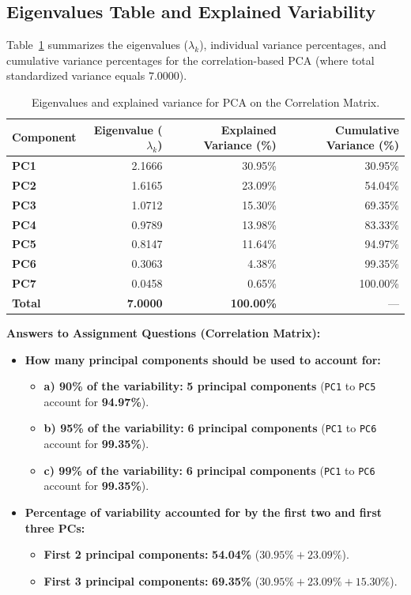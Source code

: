 \documentclass[11pt,a4paper]{article}
\begin{document}
\subsection{Eigenvalues Table and Explained Variability}

Table~\ref{tab:corr_eigen} summarizes the eigenvalues ($\lambda_k$), individual variance percentages, and cumulative variance percentages for the correlation-based PCA (where total standardized variance equals $7.0000$).

\begin{table}[H]
\centering
\caption{Eigenvalues and explained variance for PCA on the Correlation Matrix.}
\label{tab:corr_eigen}
\begin{tabular}{lrrr}
\toprule
\textbf{Component} & \textbf{Eigenvalue ($\lambda_k$)} & \textbf{Explained Variance (\%)} & \textbf{Cumulative Variance (\%)} \\
\midrule
\textbf{PC1} & 2.1666 & 30.95\% &  30.95\% \\
\textbf{PC2} & 1.6165 & 23.09\% &  54.04\% \\
\textbf{PC3} & 1.0712 & 15.30\% &  69.35\% \\
\textbf{PC4} & 0.9789 & 13.98\% &  83.33\% \\
\textbf{PC5} & 0.8147 & 11.64\% &  94.97\% \\
\textbf{PC6} & 0.3063 &  4.38\% &  99.35\% \\
\textbf{PC7} & 0.0458 &  0.65\% & 100.00\% \\
\midrule
\textbf{Total} & \textbf{7.0000} & \textbf{100.00\%} & --- \\
\bottomrule
\end{tabular}
\end{table}

\noindent
\textbf{Answers to Assignment Questions (Correlation Matrix):}
\begin{itemize}
    \item \textbf{How many principal components should be used to account for:}
    \begin{itemize}
        \item \textbf{a) 90\% of the variability:} \textbf{5 principal components} (\texttt{PC1} to \texttt{PC5} account for \textbf{94.97\%}).
        \item \textbf{b) 95\% of the variability:} \textbf{6 principal components} (\texttt{PC1} to \texttt{PC6} account for \textbf{99.35\%}).
        \item \textbf{c) 99\% of the variability:} \textbf{6 principal components} (\texttt{PC1} to \texttt{PC6} account for \textbf{99.35\%}).
    \end{itemize}
    \item \textbf{Percentage of variability accounted for by the first two and first three PCs:}
    \begin{itemize}
        \item \textbf{First 2 principal components:} \textbf{54.04\%} ($30.95\% + 23.09\%$).
        \item \textbf{First 3 principal components:} \textbf{69.35\%} ($30.95\% + 23.09\% + 15.30\%$).
    \end{itemize}
\end{itemize}
\end{document}
